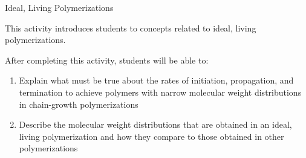 %
%
%
%

\renewcommand{\figpath}{content/polymchem/livingpolyms/ideal-living-intro/figs}
\renewcommand{\labelbase}{ideal-living-intro}

\begin{activity}{Ideal, Living Polymerizations}

\begin{instructornotes}
	This activity introduces students to concepts related to ideal, living polymerizations.
	
	After completing this activity, students will be able to:
	\begin{enumerate}
		\item Explain what must be true about the rates of initiation, propagation, and termination to achieve polymers with narrow molecular weight distributions in chain-growth polymerizations
		\item Describe the molecular weight distributions that are obtained in an ideal, living polymerization and how they compare to those obtained in other polymerizations
	\end{enumerate}
	

\end{instructornotes}
\end{activity}
